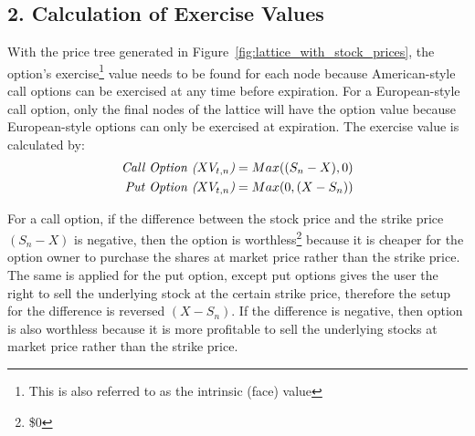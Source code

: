 \documentclass[12pt, letterpaper]{article}\usepackage{float}
\begin{document}
\pagebreak
\subsection*{2. Calculation of Exercise Values}
With the price tree generated in Figure~\ref{fig:lattice_with_stock_prices}, the option's exercise\footnote{This is also referred to as the intrinsic (face) value} value needs to be found for each node because American-style call options can be exercised at any time before expiration.
For a European-style call option, only the final nodes of the lattice will have the option value because European-style options can only be exercised at expiration. 
The exercise value is calculated \cite{bopmwikipedia} by:
\begin{align*}
  \text{\textit{Call Option (${XV_{t,n}}$)}} &= Max({(S_n - X)}, 0) \\
  \text{\textit{Put Option (${XV_{t,n}}$)}} &= Max(0, {(X - S_n)}) 
\end{align*}

\bigskip

For a call option, if the difference between the stock price and the strike price ${(S_n - X)}$ is negative, then the option is worthless\footnote{\$0} because it is cheaper for the option owner to purchase the shares at market price rather than the strike price.
The same is applied for the put option, except put options gives the user the right to sell the underlying stock at the certain strike price, therefore the setup for the difference is reversed ${(X - S_n)}$.
If the difference is negative, then option is also worthless because it is more profitable to sell the underlying stocks at market price rather than the strike price.
\end{document}
